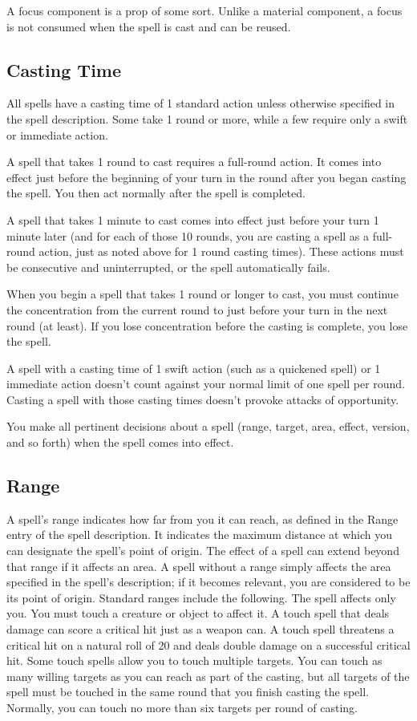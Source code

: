  A focus component is a prop of some sort. Unlike a material component, a focus is not consumed when the spell is cast and can be reused.

\subsection{Casting Time}
All spells have a casting time of 1 standard action unless otherwise specified in the spell description. Some take 1 round or more, while a few require only a swift or immediate action.

A spell that takes 1 round to cast requires a full-round action. It comes into effect just before the beginning of your turn in the round after you began casting the spell. You then act normally after the spell is completed.

A spell that takes 1 minute to cast comes into effect just before your turn 1 minute later (and for each of those 10 rounds, you are casting a spell as a full-round action, just as noted above for 1 round casting times). These actions must be consecutive and uninterrupted, or the spell automatically fails.

When you begin a spell that takes 1 round or longer to cast, you must continue the concentration from the current round to just before your turn in the next round (at least). If you lose concentration before the casting is complete, you lose the spell.

A spell with a casting time of 1 swift action (such as a quickened spell) or 1 immediate action doesn't count against your normal limit of one spell per round. Casting a spell with those casting times doesn't provoke attacks of opportunity.

You make all pertinent decisions about a spell (range, target, area, effect, version, and so forth) when the spell comes into effect.

\subsection{Range}
A spell's range indicates how far from you it can reach, as defined in the Range entry of the spell description. It indicates the maximum distance at which you can designate the spell's point of origin. The effect of a spell can extend beyond that range if it affects an area. A spell without a range simply affects the area specified in the spell's description; if it becomes relevant, you are considered to be its point of origin. Standard ranges include the following.
 The spell affects only you.
 You must touch a creature or object to affect it. A touch spell that deals damage can score a critical hit just as a weapon can. A touch spell threatens a critical hit on a natural roll of 20 and deals double damage on a successful critical hit. Some touch spells allow you to touch multiple targets. You can touch as many willing targets as you can reach as part of the casting, but all targets of the spell must be touched in the same round that you finish casting the spell. Normally, you can touch no more than six targets per round of casting.


